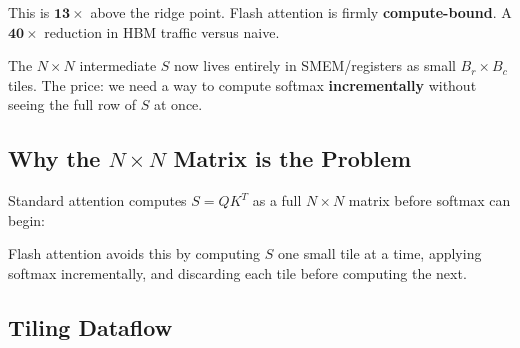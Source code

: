 \documentclass[11pt, letterpaper]{article}
\begin{document}
This is $\mathbf{13\times}$ above the ridge point. Flash attention is firmly \textbf{compute-bound}. A $\mathbf{40\times}$ reduction in HBM traffic versus naive.

The $N \times N$ intermediate $S$ now lives entirely in SMEM/registers as small $B_r \times B_c$ tiles. The price: we need a way to compute softmax \textbf{incrementally} without seeing the full row of $S$ at once.

\subsection{Why the $N \times N$ Matrix is the Problem}

Standard attention computes $S = QK^T$ as a full $N \times N$ matrix before softmax can begin:

\begin{center}
\end{center}

Flash attention avoids this by computing $S$ one small tile at a time, applying softmax incrementally, and discarding each tile before computing the next.

\subsection{Tiling Dataflow}
\end{document}
